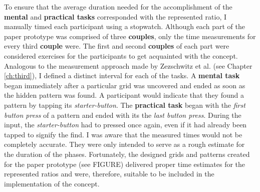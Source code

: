 To ensure that the average duration needed for the accomplishment of the \textbf{mental} and \textbf{practical tasks} corresponded with the represented ratio, I manually timed each participant using a stopwatch. Although each part of the paper prototype was comprised of three \textbf{couples}, only the time measurements for every third \textbf{couple} were. The first and second \textbf{couples} of each part were considered exercises for the participants to get acquainted with the concept. \\
Analogous to the measurement approach made by Zezschwitz et al. \cite{Zezschwitz} (see Chapter \ref{ch:third}), I defined a distinct interval for each of the tasks. A \textbf{mental task} began immediately after a particular grid was uncovered and ended as soon as the hidden pattern was found. A participant would indicate that they found a pattern by tapping its \textit{starter-button}. The \textbf{practical task} began with the \textit{first button press} of a pattern and ended with its the \textit{last button press}. During the input, the \textit{starter-button} had to pressed once again, even if it had already been tapped to signify the find. I was aware that the measured times would not be completely accurate. They were only intended to serve as a rough estimate for the duration of the phases. Fortunately, the designed grids and patterns created for the paper prototype (see FIGURE) delivered proper time estimates for the represented ratios and were, therefore, suitable to be included in the implementation of the concept.\\

